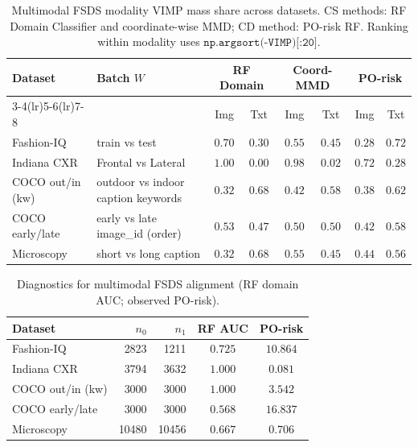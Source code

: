 
\begin{table}[ht]
\centering
\caption{Multimodal FSDS modality VIMP mass share across datasets. CS methods: RF Domain Classifier and coordinate-wise MMD; CD method: PO-risk RF. Ranking within modality uses $\texttt{np.argsort(-VIMP)[:20]}$.}
\label{tab:mm-fsds-align-mass}
\small
\begin{tabular}{@{}l l cc cc cc@{}}
\toprule
Dataset & Batch $W$ & \multicolumn{2}{c}{RF Domain} & \multicolumn{2}{c}{Coord-MMD} & \multicolumn{2}{c}{PO-risk} \\
\cmidrule(lr){3-4}\cmidrule(lr){5-6}\cmidrule(lr){7-8}
 &  & Img & Txt & Img & Txt & Img & Txt \\
\midrule
Fashion-IQ & train vs test & $0.70$ & $0.30$ & $0.55$ & $0.45$ & $0.28$ & $0.72$ \\
Indiana CXR & Frontal vs Lateral & $1.00$ & $0.00$ & $0.98$ & $0.02$ & $0.72$ & $0.28$ \\
COCO out/in (kw) & outdoor vs indoor caption keywords & $0.32$ & $0.68$ & $0.42$ & $0.58$ & $0.38$ & $0.62$ \\
COCO early/late & early vs late image_id (order) & $0.53$ & $0.47$ & $0.50$ & $0.50$ & $0.42$ & $0.58$ \\
Microscopy & short vs long caption & $0.32$ & $0.68$ & $0.55$ & $0.45$ & $0.44$ & $0.56$ \\
\bottomrule
\end{tabular}
\end{table}

\begin{table}[ht]
\centering
\caption{Diagnostics for multimodal FSDS alignment (RF domain AUC; observed PO-risk).}
\label{tab:mm-fsds-align-diag}
\small
\begin{tabular}{@{}l r r c c@{}}
\toprule
Dataset & $n_0$ & $n_1$ & RF AUC & PO-risk \\
\midrule
Fashion-IQ & 2823 & 1211 & $0.725$ & $10.864$ \\
Indiana CXR & 3794 & 3632 & $1.000$ & $0.081$ \\
COCO out/in (kw) & 3000 & 3000 & $1.000$ & $3.542$ \\
COCO early/late & 3000 & 3000 & $0.568$ & $16.837$ \\
Microscopy & 10480 & 10456 & $0.667$ & $0.706$ \\
\bottomrule
\end{tabular}
\end{table}

